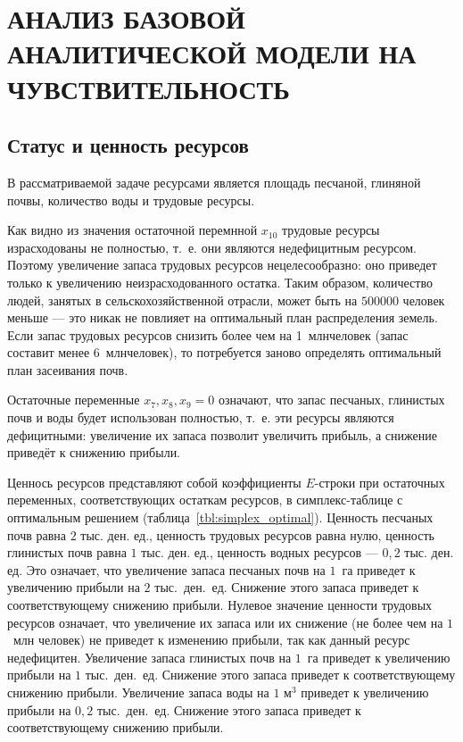 \section[АНАЛИЗ БАЗОВОЙ АНАЛИТИЧЕСКОЙ МОДЕЛИ \\ НА ЧУВСТВИТЕЛЬНОСТЬ]{АНАЛИЗ БАЗОВОЙ АНАЛИТИЧЕСКОЙ МОДЕЛИ НА ЧУВСТВИТЕЛЬНОСТЬ}

\subsection{Статус и ценность ресурсов}

В рассматриваемой задаче ресурсами является площадь песчаной, глиняной почвы, количество воды и трудовые ресурсы.

Как видно из значения остаточной перемнной $ x_{10} $ трудовые ресурсы израсходованы не полностью, т.~е. они являются недефицитным ресурсом. Поэтому увеличение запаса трудовых ресурсов нецелесообразно: оно приведет только к увеличению неизрасходованного остатка. Таким образом, количество людей, занятых в сельскохозяйственной отрасли, может быть на $ 500 000 $ человек меньше --- это никак не повлияет на оптимальный план распределения земель. Если запас трудовых ресурсов снизить более чем на 1~млнчеловек (запас составит менее 6~млнчеловек), то потребуется заново определять оптимальный план засеивания почв.

Остаточные переменные $ x_7, x_8, x_9 = 0 $ означают, что запас песчаных, глинистых почв и воды будет использован полностью, т.~е. эти ресурсы являются дефицитными: увеличение их запаса позволит увеличить прибыль, а снижение приведёт к снижению прибыли.

Ценнось ресурсов представляют собой коэффициенты $ E $-строки при остаточных переменных, соответствующих остаткам ресурсов, в симплекс-таблице с оптимальным решением (таблица~\ref{tbl:simplex_optimal}). Ценность песчаных почв равна $2$ тыс. ден. ед., ценность трудовых ресурсов равна нулю, ценность глинистых почв равна $1$ тыс. ден. ед., ценность водных ресурсов --- $0,2$ тыс. ден. ед. Это означает, что увеличение запаса песчаных почв на $1$~га приведет к увеличению прибыли на $2$ тыс.~ден.~ед. Снижение этого запаса приведет к соответствующему снижению прибыли. Нулевое значение ценности трудовых ресурсов означает, что увеличение их запаса или их снижение (не более чем на $1$~млн человек) не приведет к изменению прибыли, так как данный ресурс недефицитен. Увеличение запаса глинистых почв на $1$~га приведет к увеличению прибыли на $1$ тыс.~ден.~ед. Снижение этого запаса приведет к соответствующему снижению прибыли. Увеличение запаса воды на $1$ $ \text{м}^3 $ приведет к увеличению прибыли на $ 0,2 $ тыс.~ден.~ед. Снижение этого запаса приведет к соответствующему снижению прибыли.


